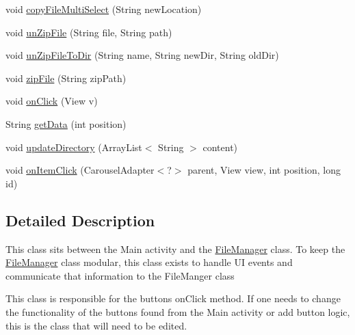 \begin{DoxyCompactItemize}
\item 
void \hyperlink{classcom_1_1zia_1_1freshdocs_1_1widget_1_1fileexplorer_1_1_event_handler_aca87cfdd2a55926ac931dec799bece65}{copy\-File\-Multi\-Select} (String new\-Location)
\item 
void \hyperlink{classcom_1_1zia_1_1freshdocs_1_1widget_1_1fileexplorer_1_1_event_handler_a8ad10fcbfc47c55e457e5170babeaab6}{un\-Zip\-File} (String file, String path)
\item 
void \hyperlink{classcom_1_1zia_1_1freshdocs_1_1widget_1_1fileexplorer_1_1_event_handler_a1d9ab4ac68337bd5e2d3a3a861e4116d}{un\-Zip\-File\-To\-Dir} (String name, String new\-Dir, String old\-Dir)
\item 
void \hyperlink{classcom_1_1zia_1_1freshdocs_1_1widget_1_1fileexplorer_1_1_event_handler_a2b050f1cde54eaac4038c1d167af7091}{zip\-File} (String zip\-Path)
\item 
void \hyperlink{classcom_1_1zia_1_1freshdocs_1_1widget_1_1fileexplorer_1_1_event_handler_a31f0e84355740c86744dc9b9b59fcb73}{on\-Click} (View v)
\item 
String \hyperlink{classcom_1_1zia_1_1freshdocs_1_1widget_1_1fileexplorer_1_1_event_handler_a27d007a18fc249cc35225f632c6fe461}{get\-Data} (int position)
\item 
void \hyperlink{classcom_1_1zia_1_1freshdocs_1_1widget_1_1fileexplorer_1_1_event_handler_a19a612cc503adf1d0dbd9e69c0ef99a7}{update\-Directory} (Array\-List$<$ String $>$ content)
\item 
void \hyperlink{classcom_1_1zia_1_1freshdocs_1_1widget_1_1fileexplorer_1_1_event_handler_add98748a606ec3c8fe30e72834d09db1}{on\-Item\-Click} (Carousel\-Adapter$<$?$>$ parent, View view, int position, long id)
\end{DoxyCompactItemize}


\subsection{Detailed Description}
This class sits between the Main activity and the \hyperlink{classcom_1_1zia_1_1freshdocs_1_1widget_1_1fileexplorer_1_1_file_manager}{File\-Manager} class. To keep the \hyperlink{classcom_1_1zia_1_1freshdocs_1_1widget_1_1fileexplorer_1_1_file_manager}{File\-Manager} class modular, this class exists to handle U\-I events and communicate that information to the File\-Manger class

This class is responsible for the buttons on\-Click method. If one needs to change the functionality of the buttons found from the Main activity or add button logic, this is the class that will need to be edited.

